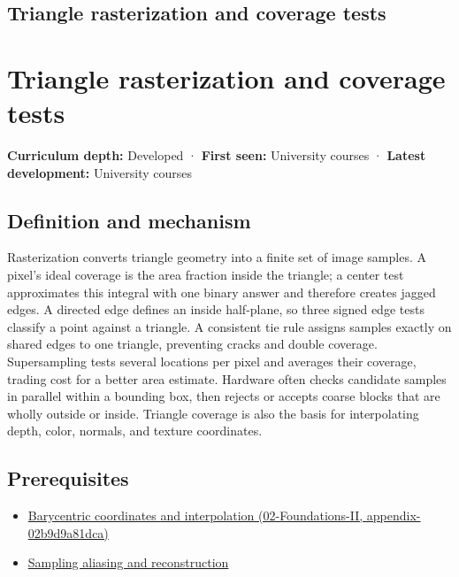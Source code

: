 \hypertarget{appendix-ed3f9bc298fe}{}
\section*{Triangle rasterization and coverage tests}
\chapter{Triangle rasterization and coverage tests}\label{appendix-ed3f9bc298fe-triangle-rasterization-and-coverage-tests}

\textbf{Curriculum depth:} Developed · \textbf{First seen:} University courses · \textbf{Latest development:} University courses

\section{Definition and mechanism}\label{appendix-ed3f9bc298fe-definition-and-mechanism}

Rasterization converts triangle geometry into a finite set of image samples. A pixel's ideal coverage is the area fraction inside the triangle; a center test approximates this integral with one binary answer and therefore creates jagged edges. A directed edge defines an inside half-plane, so three signed edge tests classify a point against a triangle. A consistent tie rule assigns samples exactly on shared edges to one triangle, preventing cracks and double coverage. Supersampling tests several locations per pixel and averages their coverage, trading cost for a better area estimate. Hardware often checks candidate samples in parallel within a bounding box, then rejects or accepts coarse blocks that are wholly outside or inside. Triangle coverage is also the basis for interpolating depth, color, normals, and texture coordinates.

\section{Prerequisites}\label{appendix-ed3f9bc298fe-prerequisites}

\begin{itemize}
\tightlist
\item
  \href{../02-Foundations-II/main.pdf\#nameddest=appendix-02b9d9a81dca}{Barycentric coordinates and interpolation (02-Foundations-II, appendix-02b9d9a81dca)}
\item
  \hyperref[appendix-6a7869dd79a6]{Sampling aliasing and reconstruction}
\end{itemize}

